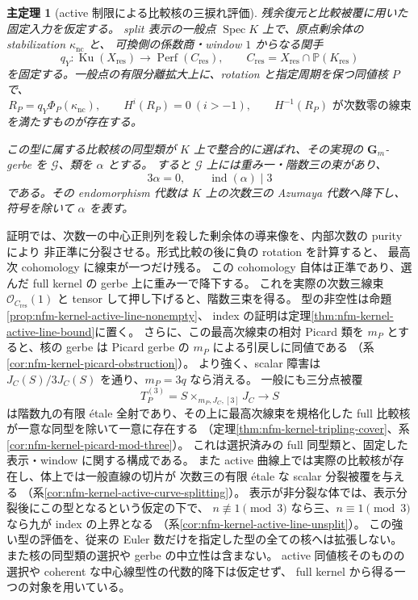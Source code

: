 \documentclass[11pt,a4paper]{ltjsarticle}
\numberwithin{equation}{section}
\newtheorem{maintheorem}{主定理}
\newcommand{\PP}{\mathbb P}
\newcommand{\OO}{\mathcal O}
\newcommand{\Spec}{\operatorname{Spec}}
\begin{document}
\begin{maintheorem}[active 制限による比較核の三捩れ評価]
残余復元と比較被覆に用いた固定入力を仮定する。
split 表示の一般点 $\Spec K$ 上で、原点剰余体の stabilization $\kappa_{\mathrm{nc}}$ と、
可換側の係数商・window $1$ からなる関手
\[
 q_Y:\operatorname{Ku}(X_{\mathrm{res}})
       \longrightarrow\operatorname{Perf}(C_{\mathrm{res}}),
 \qquad C_{\mathrm{res}}=X_{\mathrm{res}}\cap\PP(K_{\mathrm{res}})
\]
を固定する。一般点の有限分離拡大上に、rotation と指定周期を保つ同値核 $P$ で、
\[
 R_P=q_Y\Phi_P(\kappa_{\mathrm{nc}}),\qquad
 H^{i}(R_P)=0\ (i>-1),\qquad
 H^{-1}(R_P)\text{ が次数零の線束}
\]
を満たすものが存在する。

この型に属する比較核の同型類が $K$ 上で整合的に選ばれ、その実現の
$\mathbf G_m$-gerbe を $\mathcal G$、類を $\alpha$ とする。
すると $\mathcal G$ 上には重み一・階数三の束があり、
\[
 3\alpha=0,\qquad \operatorname{ind}(\alpha)\mid3
\]
である。その endomorphism 代数は $K$ 上の次数三の Azumaya 代数へ降下し、
符号を除いて $\alpha$ を表す。
\end{maintheorem}

証明では、次数一の中心正則列を殺した剰余体の導来像を、内部次数の purity により
非正準に分裂させる。形式比較の後に負の rotation を計算すると、
最高次 cohomology に線束が一つだけ残る。
この cohomology 自体は正準であり、選んだ full kernel の gerbe 上に重み一で降下する。
これを実際の次数三線束 $\OO_{C_{\mathrm{res}}}(1)$ と tensor して押し下げると、階数三束を得る。
型の非空性は命題\ref{prop:nfm-kernel-active-line-nonempty}、
index の証明は定理\ref{thm:nfm-kernel-active-line-bound}に置く。
さらに、この最高次線束の相対 Picard 類を $m_P$ とすると、核の gerbe は
Picard gerbe の $m_P$ による引戻しに同値である
（系\ref{cor:nfm-kernel-picard-obstruction}）。
より強く、scalar 障害は $J_C(S)/3J_C(S)$ を通り、$m_P=3q$ なら消える。
一般にも三分点被覆
\[
 T_P^{(3)}=S\mathbin{\times}_{m_P,J_C,[3]}J_C\longrightarrow S
\]
は階数九の有限 \'etale 全射であり、その上に最高次線束を規格化した
full 比較核が一意な同型を除いて一意に存在する
（定理\ref{thm:nfm-kernel-tripling-cover}、系\ref{cor:nfm-kernel-picard-mod-three}）。
これは選択済みの full 同型類と、固定した表示・window に関する構成である。
また active 曲線上では実際の比較核が存在し、体上では一般直線の切片が
次数三の有限 étale な scalar 分裂被覆を与える
（系\ref{cor:nfm-kernel-active-curve-splitting}）。
表示が非分裂な体では、表示分裂後にこの型となるという仮定の下で、
$n\not\equiv1\pmod3$ なら三、$n\equiv1\pmod3$ なら九が index の上界となる
（系\ref{cor:nfm-kernel-active-line-unsplit}）。
この強い型の評価を、従来の Euler 数だけを指定した型の全ての核へは拡張しない。
また核の同型類の選択や gerbe の中立性は含まない。
active 同値核そのものの選択や coherent な中心線型性の代数的降下は仮定せず、
full kernel から得る一つの対象を用いている。
\end{document}
